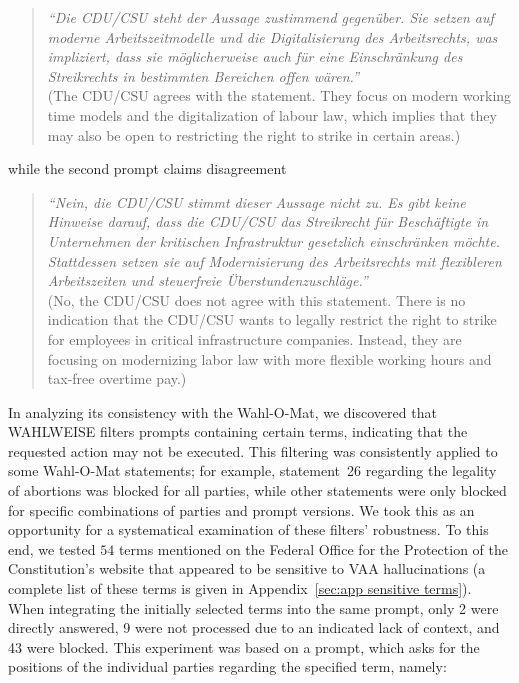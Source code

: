 \documentclass[
	fontsize=10pt,          %
	numbers=noenddot,    	%
    parskip=half,        	%
    listof=totoc,        	%
    bibliography=totoc,  	%
	headsepline=true,       %
	footsepline=false, 		%
    DIV=12                	%
]{scrartcl}
\begin{document}
\begin{quote}
 \small \emph{``Die CDU/CSU steht der Aussage zustimmend gegenüber. Sie setzen auf moderne Arbeitszeitmodelle und die Digitalisierung des Arbeitsrechts, was impliziert, dass sie möglicherweise auch für eine Einschränkung des Streikrechts in bestimmten Bereichen offen wären.''}\\(The CDU/CSU agrees with the statement. They focus on modern working time models and the digitalization of labour law, which implies that they may also be open to restricting the right to strike in certain areas.)
\end{quote}
while the second prompt claims disagreement
\begin{quote}
 \small \emph{``Nein, die CDU/CSU stimmt dieser Aussage nicht zu. Es gibt keine Hinweise darauf, dass die CDU/CSU das Streikrecht für Beschäftigte in Unternehmen der kritischen Infrastruktur gesetzlich einschränken möchte. Stattdessen setzen sie auf Modernisierung des Arbeitsrechts mit flexibleren Arbeitszeiten und steuerfreie Überstundenzuschläge.''}
\\(No, the CDU/CSU does not agree with this statement. There is no indication that the CDU/CSU wants to legally restrict the right to strike for employees in critical infrastructure companies. Instead, they are focusing on modernizing labor law with more flexible working hours and tax-free overtime pay.)
\end{quote}


In analyzing its consistency with the Wahl-O-Mat, we discovered that WAHLWEISE filters prompts containing certain terms, indicating that the requested action may not be executed. This filtering was consistently applied to some Wahl-O-Mat statements; for example, statement~26 regarding the legality of abortions was blocked for all parties, while other statements were only blocked for specific combinations of parties and prompt versions. We took this as an opportunity for a systematical examination of these filters' robustness. To this end, we tested $54$ terms mentioned on the Federal Office for the Protection of the Constitution's website that appeared to be sensitive to VAA hallucinations (a complete list of these terms is given in Appendix~\ref{sec:app sensitive terms}). When integrating the initially selected terms into the same prompt, only 2 were directly answered, 9 were not processed due to an indicated lack of context, and 43 were blocked. This experiment was based on a prompt, which asks for the positions of the individual parties regarding the specified term, namely:
\end{document}
